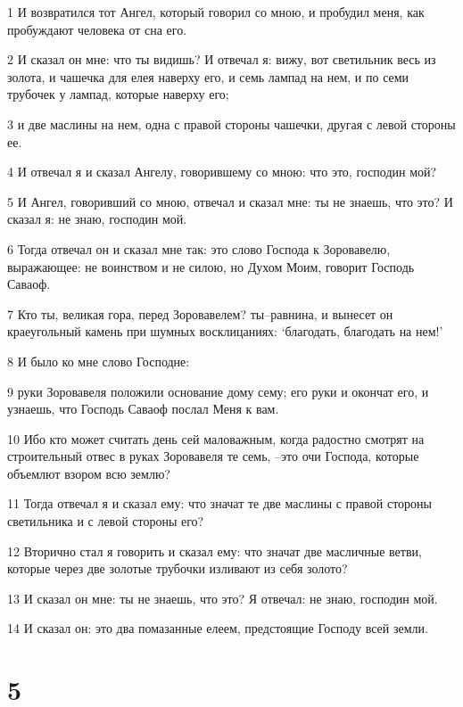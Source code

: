 \par 1 И возвратился тот Ангел, который говорил со мною, и пробудил меня, как пробуждают человека от сна его.
\par 2 И сказал он мне: что ты видишь? И отвечал я: вижу, вот светильник весь из золота, и чашечка для елея наверху его, и семь лампад на нем, и по семи трубочек у лампад, которые наверху его;
\par 3 и две маслины на нем, одна с правой стороны чашечки, другая с левой стороны ее.
\par 4 И отвечал я и сказал Ангелу, говорившему со мною: что это, господин мой?
\par 5 И Ангел, говоривший со мною, отвечал и сказал мне: ты не знаешь, что это? И сказал я: не знаю, господин мой.
\par 6 Тогда отвечал он и сказал мне так: это слово Господа к Зоровавелю, выражающее: не воинством и не силою, но Духом Моим, говорит Господь Саваоф.
\par 7 Кто ты, великая гора, перед Зоровавелем? ты--равнина, и вынесет он краеугольный камень при шумных восклицаниях: `благодать, благодать на нем!'
\par 8 И было ко мне слово Господне:
\par 9 руки Зоровавеля положили основание дому сему; его руки и окончат его, и узнаешь, что Господь Саваоф послал Меня к вам.
\par 10 Ибо кто может считать день сей маловажным, когда радостно смотрят на строительный отвес в руках Зоровавеля те семь, --это очи Господа, которые объемлют взором всю землю?
\par 11 Тогда отвечал я и сказал ему: что значат те две маслины с правой стороны светильника и с левой стороны его?
\par 12 Вторично стал я говорить и сказал ему: что значат две масличные ветви, которые через две золотые трубочки изливают из себя золото?
\par 13 И сказал он мне: ты не знаешь, что это? Я отвечал: не знаю, господин мой.
\par 14 И сказал он: это два помазанные елеем, предстоящие Господу всей земли.

\chapter{5}

